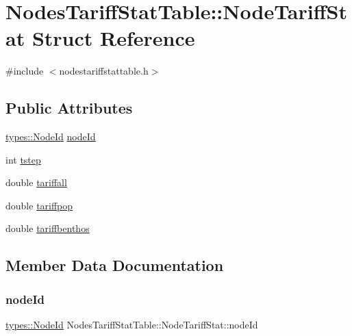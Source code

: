 \hypertarget{struct_nodes_tariff_stat_table_1_1_node_tariff_stat}{}\section{Nodes\+Tariff\+Stat\+Table\+::Node\+Tariff\+Stat Struct Reference}
\label{struct_nodes_tariff_stat_table_1_1_node_tariff_stat}


{\ttfamily \#include $<$nodestariffstattable.\+h$>$}

\subsection*{Public Attributes}
\begin{DoxyCompactItemize}
\item 
\mbox{\hyperlink{classtypes_1_1_node_id}{types\+::\+Node\+Id}} \mbox{\hyperlink{struct_nodes_tariff_stat_table_1_1_node_tariff_stat_aff994bbd7ac781171b3ba10a276ca4f1}{node\+Id}}
\item 
int \mbox{\hyperlink{struct_nodes_tariff_stat_table_1_1_node_tariff_stat_a44ef49d5fd5bb9f451008a8f1e3f033b}{tstep}}
\item 
double \mbox{\hyperlink{struct_nodes_tariff_stat_table_1_1_node_tariff_stat_af849179f830f1d8ee6e4c4e08e50dcf5}{tariffall}}
\item 
double \mbox{\hyperlink{struct_nodes_tariff_stat_table_1_1_node_tariff_stat_a76278bacc8febfbbf5e1983c9a9f021b}{tariffpop}}
\item 
double \mbox{\hyperlink{struct_nodes_tariff_stat_table_1_1_node_tariff_stat_ada401a46517782ebf515ba8766d7fce4}{tariffbenthos}}
\end{DoxyCompactItemize}


\subsection{Member Data Documentation}
\mbox{\label{struct_nodes_tariff_stat_table_1_1_node_tariff_stat_aff994bbd7ac781171b3ba10a276ca4f1}} 
\subsubsection{\texorpdfstring{nodeId}{nodeId}}
{\footnotesize\ttfamily \mbox{\hyperlink{classtypes_1_1_node_id}{types\+::\+Node\+Id}} Nodes\+Tariff\+Stat\+Table\+::\+Node\+Tariff\+Stat\+::node\+Id}

